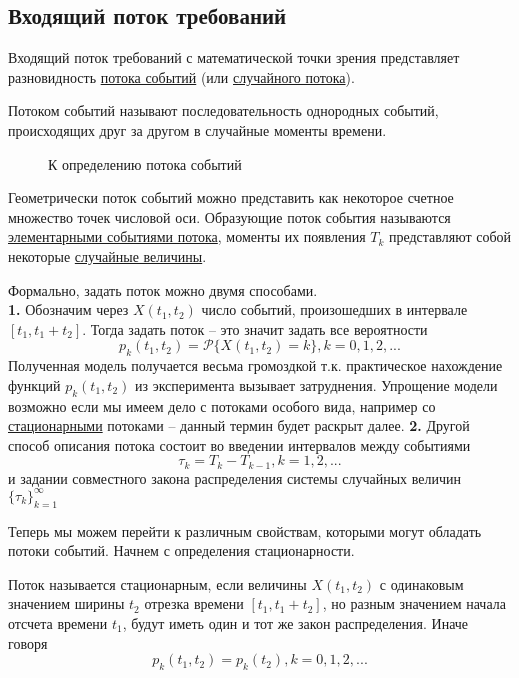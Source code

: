 
\subsection{Входящий поток требований}

Входящий поток требований с математической точки зрения представляет разновидность \underline{потока событий} (или \underline{случайного потока}).

\begin{definition}
	{\color{red}Потоком событий} называют последовательность однородных событий, происходящих друг за другом в случайные моменты времени.
\end{definition}

\begin{figure}[h!]
	\centering
	\caption{К определению потока событий}
\end{figure}

Геометрически поток событий можно представить как некоторое счетное множество точек числовой оси. Образующие поток события называются \\ \underline{элементарными событиями потока}, моменты их появления $T_k$ представляют собой некоторые \underline{случайные величины}.

Формально, задать поток можно двумя способами. \\
\textbf{1.} Обозначим через $X(t_1, t_2)$ число событий, произошедших в интервале \\ $[t_1, t_1 + t_2]$. Тогда задать поток -- это значит задать все вероятности
$$p_k (t_1, t_2) = \mathcal{P}\{X(t_1, t_2) = k\}, k = 0, 1, 2, ...$$
Полученная модель получается весьма громоздкой т.к. практическое нахождение функций $p_k (t_1, t_2)$ из эксперимента вызывает затруднения. Упрощение модели возможно если мы имеем дело с потоками особого вида, например со \underline{стационарными} потоками -- данный термин будет раскрыт далее.
\textbf{2.} Другой способ описания потока состоит во введении интервалов между событиями
$$\tau_k = T_k - T_{k-1}, k = 1, 2, ...$$
и задании совместного закона распределения системы случайных величин $\{\tau_k\}_{k=1}^{\infty}$

Теперь мы можем перейти к различным свойствам, которыми могут обладать потоки событий. Начнем с определения стационарности.

\begin{definition}
	Поток называется {\color{red}стационарным}, если величины $X(t_1, t_2)$ с одинаковым значением ширины $t_2$ отрезка времени $[t_1, t_1 + t_2]$, но разным значением начала отсчета времени $t_1$, будут иметь один и тот же закон распределения. Иначе говоря
	$$p_k (t_1, t_2) = p_k (t_2), k = 0, 1, 2, ...$$
\end{definition}

